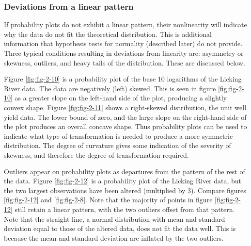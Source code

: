 \documentclass[]{book}
\begin{document}
\hypertarget{deviations-from-a-linear-pattern}{%
\subsubsection{Deviations from a linear pattern}\label{deviations-from-a-linear-pattern}}

If probability plots do not exhibit a linear pattern, their nonlinearity will indicate why the data do not fit the theoretical distribution. This is additional information that hypothesis tests for normality (described later) do not provide. Three typical conditions resulting in deviations from linearity are: asymmetry or skewness, outliers, and heavy tails of the distribution. These are
discussed below.

Figure \ref{fig:fig-2-10} is a probability plot of the base 10 logarithms of the Licking River data. The data are negatively (left) skewed. This is seen in figure \ref{fig:fig-2-10} as a greater slope on the left-hand side of the plot, producing a slightly convex shape. Figure \ref{fig:fig-2-11} shows a right-skewed distribution, the unit well yield data. The lower bound of zero, and the large slope on the right-hand side of the plot produces an overall concave shape. Thus probability plots can be used to indicate what type of transformation is needed to produce a more symmetric distribution. The degree of curvature gives some indication of the severity of skewness, and therefore the degree of transformation required.

Outliers appear on probability plots as departures from the pattern of the rest of the data. Figure \ref{fig:fig-2-12} is a probability plot of the Licking River data, but the two largest observations have been altered (multiplied by 3). Compare figures \ref{fig:fig-2-12} and \ref{fig:fig-2-8}. Note that the majority of points in figure \ref{fig:fig-2-12} still retain a linear pattern, with the two outliers offset from that pattern. Note that the straight line, a normal distribution with mean and standard deviation equal to those of the altered data, does not fit the data well. This is because the mean and standard deviation are inflated by the two outliers.
\end{document}
